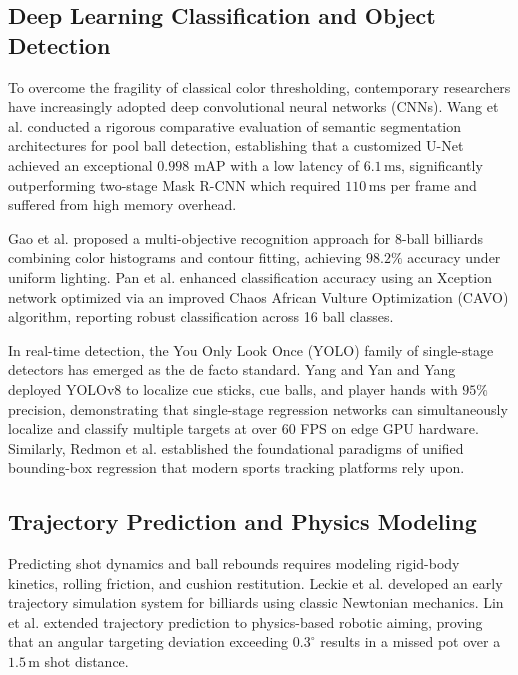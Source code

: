 \subsection{Deep Learning Classification and Object Detection}
To overcome the fragility of classical color thresholding, contemporary researchers have increasingly adopted deep convolutional neural networks (CNNs). Wang et al. \cite{ref1} conducted a rigorous comparative evaluation of semantic segmentation architectures for pool ball detection, establishing that a customized U-Net \cite{ref30} achieved an exceptional $0.998$ mAP with a low latency of $6.1\,\text{ms}$, significantly outperforming two-stage Mask R-CNN \cite{ref29} which required $110\,\text{ms}$ per frame and suffered from high memory overhead.

Gao et al. \cite{ref2} proposed a multi-objective recognition approach for 8-ball billiards combining color histograms and contour fitting, achieving $98.2\%$ accuracy under uniform lighting. Pan et al. \cite{ref3} enhanced classification accuracy using an Xception network optimized via an improved Chaos African Vulture Optimization (CAVO) algorithm, reporting robust classification across 16 ball classes. 

In real-time detection, the You Only Look Once (YOLO) family of single-stage detectors has emerged as the de facto standard. Yang and Yan \cite{ref11} and Yang \cite{ref12} deployed YOLOv8 to localize cue sticks, cue balls, and player hands with $95\%$ precision, demonstrating that single-stage regression networks can simultaneously localize and classify multiple targets at over 60 FPS on edge GPU hardware. Similarly, Redmon et al. \cite{ref31, ref32} established the foundational paradigms of unified bounding-box regression that modern sports tracking platforms rely upon.

\subsection{Trajectory Prediction and Physics Modeling}
Predicting shot dynamics and ball rebounds requires modeling rigid-body kinetics, rolling friction, and cushion restitution. Leckie et al. \cite{ref6} developed an early trajectory simulation system for billiards using classic Newtonian mechanics. Lin et al. \cite{ref10} extended trajectory prediction to physics-based robotic aiming, proving that an angular targeting deviation exceeding $0.3^\circ$ results in a missed pot over a $1.5\,\text{m}$ shot distance. 

